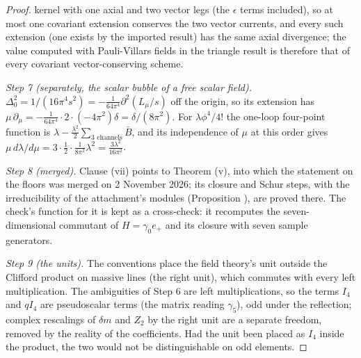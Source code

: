 \begin{proof}
kernel with one axial and two vector legs (the $\epsilon$ terms included), so at most one covariant extension conserves the two vector currents, and every such extension (one exists by the imported result) has the same axial divergence; the value computed with Pauli-Villars fields in the triangle result  is therefore that of every covariant vector-conserving scheme.

\emph{Step 7 (separately, the scalar bubble of a free scalar field).} $\Delta_{0}^{2} = 1/(16\pi^{4}s^{2}) = -\frac{1}{64\pi^{4}}\partial^{2}(L_{\mu}/s)$ off the origin, so its extension has $\mu\,\partial_{\mu} = -\frac{1}{64\pi^{4}}\cdot 2\cdot(-4\pi^{2})\delta = \delta/(8\pi^{2})$. For $\lambda\phi^{4}/4!$ the one-loop four-point function is $\lambda - \frac{\lambda^{2}}{2}\sum_{\text{3 channels}}\bar B$, and its independence of $\mu$ at this order gives $\mu\,d\lambda/d\mu = 3\cdot\frac12\cdot\frac{1}{8\pi^{2}}\lambda^{2} = \frac{3\lambda^{2}}{16\pi^{2}}$.

\emph{Step 8 (merged).} Clause (vii) points to Theorem (v), into which the statement on the floors was merged on 2 November 2026; its closure and Schur steps, with the irreducibility of the attachment's modules (Proposition ), are proved there. The check's function for it is kept as a cross-check: it recomputes the seven-dimensional commutant of $H = \gamma_{0}e_{+}$ and its closure with seven sample generators.

\emph{Step 9 (the units).} The conventions place the field theory's unit outside the Clifford product on massive lines (the right unit), which commutes with every left multiplication. The ambiguities of Step 6 are left multiplications, so the terms $I_{4}$ and $qI_{4}$ are pseudoscalar terms (the matrix reading $\gamma_{5}$), odd under the reflection; complex rescalings of $\delta m$ and $Z_{2}$ by the right unit are a separate freedom, removed by the reality of the coefficients. Had the unit been placed as $I_{4}$ inside the product, the two would not be distinguishable on odd elements.


\end{proof}
